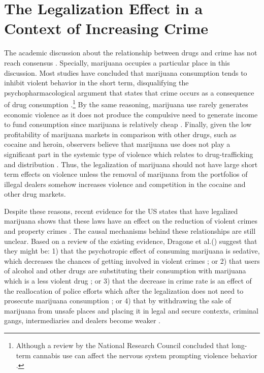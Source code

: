 \documentclass[11pt]{article}
\begin{document}
\section{The Legalization Effect in a Context of Increasing Crime}
The academic discussion about the relationship between drugs and crime has not reach consensus \citep{white2000dynamics}. Specially, marijuana occupies a particular place in this discussion. Most studies have concluded that marijuana consumption tends to inhibit violent behavior in the short term, disqualifying the psychopharmacological argument \citep{white2000dynamics} that states that crime occurs as a consequence of drug consumption \citep{goldstein1985drugs}.\footnote{Although a review by the National Research Council concluded that long-term cannabis use can affect the nervous system prompting violence behavior \citep{national1994understanding}.} By the same reasoning, marijuana use rarely generates economic violence as it does not produce the compulsive need to generate income to fund consumption since marijuana is relatively cheap \citep{caulkins2016marijuana}. Finally, given the low profitability of marijuana markets in comparison with other drugs, such as cocaine and heroin, observers believe that marijuana use does not play a significant part in the systemic type of violence \citep{pacula2003marijuana, caulkins2015considering} which relates to drug-trafficking and distribution \citep{goldstein1985drugs}. Thus, the legalization of marijuana should not have large short term effects on violence unless the removal of marijuana from the portfolios of illegal dealers somehow increases violence and competition in the cocaine and other drug markets.

Despite these reasons, recent evidence for the US states that have legalized marijuana shows that these laws have an effect on the reduction of violent crimes and property crimes \citep{dragone2019crime, Indigo:2016, gavrilova2014legal, huber2016cannabis, brinkman2017not}. The causal mechanisms behind these relationships are still unclear. Based on a review of the existing evidence, Dragone et al.(\citeyear{dragone2019crime}) suggest that they might be: 1) that the psychotropic effect of consuming marijuana is sedative, which decreases the chances of getting involved in violent crimes \citep{no2001health, green2003being}; or 2) that users of alcohol and other drugs are substituting their consumption with marijuana which is a less violent drug \citep{anderson2014legalization, kelly2014policing} ; or 3) that the decrease in crime rate is an effect of the reallocation of police efforts which after the legalization does not need to prosecute marijuana consumption \citep{adda2014crime}; or 4) that by withdrawing the sale of marijuana from unsafe places and placing it in legal and secure contexts, criminal gangs, intermediaries and dealers become weaker \citep{becker2013have}.
\end{document}
